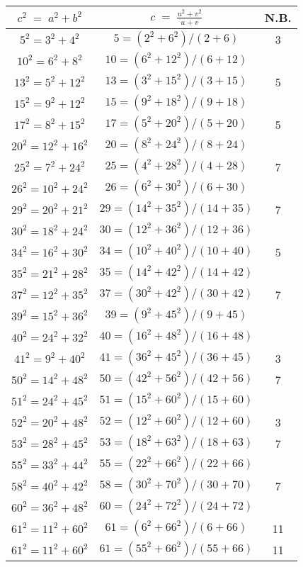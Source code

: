 \documentclass[12pt]{article}
\theoremstyle{definition}
\begin{document}
\begin{center}
\begin{tabular}{|c|c|c|}
\hline\hline
$c^2 \;=\; a^2+b^2$ & $\displaystyle c \;=\; \frac{u^2+v^2}{u+v}$ & N.B. \\
\hline\hline
$5^2 = 3^2+4^2$ & $5 = (2^2+6^2)/(2+6)$ & 3\\
\hline 
$10^2 = 6^2+8^2$ & $10 = (6^2+12^2)/(6+12)$ & \\
\hline
$13^2 = 5^2+12^2$ & $13 = (3^2+15^2)/(3+15)$ & 5\\
\hline
$15^2 = 9^2+12^2$ & $15 = (9^2+18^2)/(9+18)$ & \\
\hline
$17^2 = 8^2+15^2$ & $17 = (5^2+20^2)/(5+20)$ & 5\\
\hline
$20^2 = 12^2+16^2$ & $20 = (8^2+24^2)/(8+24)$ & \\
\hline
$25^2 = 7^2+24^2$ & $25 = (4^2+28^2)/(4+28)$ & 7\\
\hline
$26^2 = 10^2+24^2$ & $26 = (6^2+30^2)/(6+30)$ & \\
\hline
$29^2 = 20^2+21^2$ & $29 = (14^2+35^2)/(14+35)$ & 7\\
\hline
$30^2 = 18^2+24^2$ & $30 = (12^2+36^2)/(12+36)$ & \\
\hline
$34^2 = 16^2+30^2$ & $34 = (10^2+40^2)/(10+40)$ & 5\\
\hline
$35^2 = 21^2+28^2$ & $35 = (14^2+42^2)/(14+42)$ & \\
\hline
$37^2 = 12^2+35^2$ & $37 = (30^2+42^2)/(30+42)$ & 7\\
\hline
$39^2 = 15^2+36^2$ & $39 = (9^2+45^2)/(9+45)$ & \\
\hline
$40^2 = 24^2+32^2$ & $40 = (16^2+48^2)/(16+48)$ & \\
\hline
$41^2 = 9^2+40^2$ & $41 = (36^2+45^2)/(36+45)$ & 3\\
\hline
$50^2 = 14^2+48^2$ & $50 = (42^2+56^2)/(42+56)$ & 7\\
\hline
$51^2 = 24^2+45^2$ & $51 = (15^2+60^2)/(15+60)$ & \\
\hline
$52^2 = 20^2+48^2$ & $52 = (12^2+60^2)/(12+60)$ & 3\\
\hline
$53^2 = 28^2+45^2$ & $53 = (18^2+63^2)/(18+63)$ & 7\\
\hline
$55^2 = 33^2+44^2$ & $55 = (22^2+66^2)/(22+66)$ & \\
\hline
$58^2 = 40^2+42^2$ & $58 = (30^2+70^2)/(30+70)$ & 7\\
\hline
$60^2 = 36^2+48^2$ & $60 = (24^2+72^2)/(24+72)$ & \\
\hline
$61^2 = 11^2+60^2$ & $61 = (6^2+66^2)/(6+66)$ & 11\\
\hline
$61^2 = 11^2+60^2$ & $61 = (55^2+66^2)/(55+66)$ & 11\\


\end{tabular}
\end{center}
\end{document}
